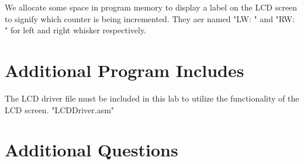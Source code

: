 \documentclass[12pt, letterpaper]{article}
\begin{document}
We allocate some space in program memory to display a label on the LCD screen to signify which counter is being incremented. They aer named "LW: " and "RW: " for left and right whisker respectively.


\section{Additional Program Includes}

The LCD driver file must be included in this lab to utilize the functionality of the LCD screen. "LCDDriver.asm"


\section{Additional Questions}
\end{document}
